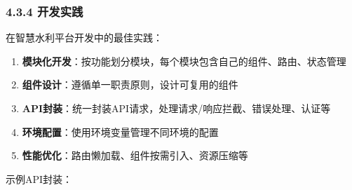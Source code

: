 \subsubsection{4.3.4 开发实践}\label{ux5f00ux53d1ux5b9eux8df5}

在智慧水利平台开发中的最佳实践：

\begin{enumerate}
\def\labelenumi{\arabic{enumi}.}
\tightlist
\item
  \textbf{模块化开发}：按功能划分模块，每个模块包含自己的组件、路由、状态管理
\item
  \textbf{组件设计}：遵循单一职责原则，设计可复用的组件
\item
  \textbf{API封装}：统一封装API请求，处理请求/响应拦截、错误处理、认证等
\item
  \textbf{环境配置}：使用环境变量管理不同环境的配置
\item
  \textbf{性能优化}：路由懒加载、组件按需引入、资源压缩等
\end{enumerate}

示例API封装：

